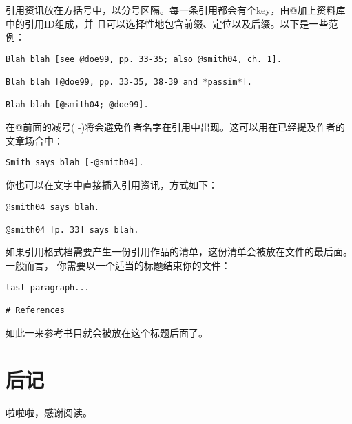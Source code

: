 \documentclass[cn]{elegantbook}
\begin{document}
引用资讯放在方括号中，以分号区隔。每一条引用都会有个key，由@加上资料库中的引用ID组成，并
且可以选择性地包含前缀、定位以及后缀。以下是一些范例：

\begin{lstlisting}
Blah blah [see @doe99, pp. 33-35; also @smith04, ch. 1].

Blah blah [@doe99, pp. 33-35, 38-39 and *passim*].

Blah blah [@smith04; @doe99].
\end{lstlisting}

在@前面的减号(
-)将会避免作者名字在引用中出现。这可以用在已经提及作者的文章场合中：

\begin{lstlisting}
Smith says blah [-@smith04].
\end{lstlisting}

你也可以在文字中直接插入引用资讯，方式如下：

\begin{lstlisting}
@smith04 says blah.

@smith04 [p. 33] says blah.
\end{lstlisting}

如果引用格式档需要产生一份引用作品的清单，这份清单会被放在文件的最后面。一般而言，
你需要以一个适当的标题结束你的文件：

\begin{lstlisting}
last paragraph...

# References
\end{lstlisting}

如此一来参考书目就会被放在这个标题后面了。

\backmatter


\hypertarget{ux540eux8bb0}{%
\chapter{后记}\label{ux540eux8bb0}}

啦啦啦，感谢阅读。
\end{document}
